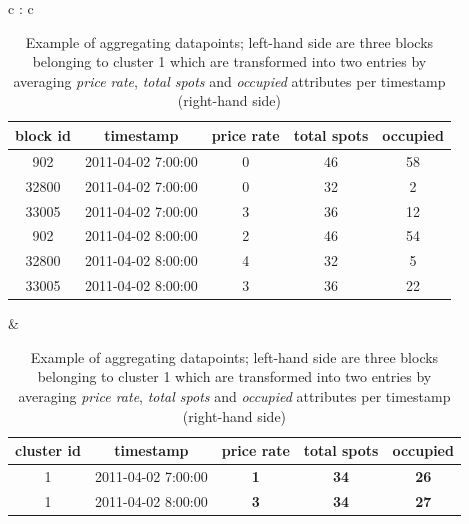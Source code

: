 {\begin{table}
{\color{green}
\footnotesize
\begin{tabular}{  c : c  }
		\begin{tabular}{ | c | c | c | c | c |}
			\hline
			\textbf{block id} & \textbf{timestamp} & \textbf{price rate} & \textbf{total spots} & \textbf{occupied} \\ \hline
			902   & {2011-04-02 7:00:00} & 0 & 46 & 58 \\ \hline
			32800 & {2011-04-02 7:00:00} & 0 & 32 & 2 \\ \hline
			33005 & {2011-04-02 7:00:00} & 3 & 36 & 12 \\ \hline
			902   & {2011-04-02 8:00:00} & 2 & 46 & 54 \\ \hline
			32800 & {2011-04-02 8:00:00} & 4 & 32 & 5 \\ \hline
			33005 & {2011-04-02 8:00:00} & 3 & 36 & 22 \\ \hline
		\end{tabular}
 & 
		\begin{tabular}{ | c | c | c | c | c |}
			\hline
			\textbf{cluster id} & \textbf{timestamp} & \textbf{price rate} & \textbf{total spots} & \textbf{occupied} \\ \hline
			1 & {2011-04-02 7:00:00} & \textbf{1} & \textbf{34} & \textbf{26} \\ \hline
			1 & {2011-04-02 8:00:00} & \textbf{3} & \textbf{34} & \textbf{27} \\ \hline
		\end{tabular}
\end{tabular}}
\caption{\color{green} Example of aggregating datapoints; left-hand side are three blocks belonging to cluster 1 which are transformed into two entries by averaging \textit{price rate}, \textit{total spots} and \textit{occupied} attributes per timestamp (right-hand side)}
\label{extensions:aggregating_datapoints}
\end{table}

}
